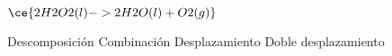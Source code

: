 $\ce{2H2O2(l) -> 2H2O(l) + O2(g)}$

\begin{choices}
    \CorrectChoice Descomposición
    \choice Combinación
    \choice Desplazamiento
    \choice Doble desplazamiento
\end{choices}